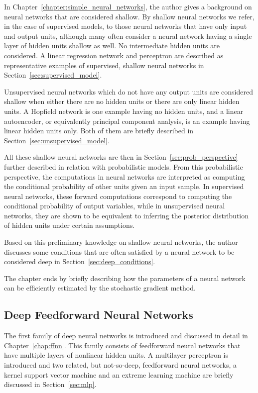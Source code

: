 \documentclass{now}
\begin{document}
In Chapter~\ref{chapter:simple_neural_networks}, the author gives a background
on neural networks that are considered shallow. By shallow neural networks we
refer, in the case of supervised models, to those neural networks that have
only input and output units, although many often consider a neural network
having a single layer of hidden units shallow as well. No intermediate hidden
units are considered. A linear regression network and perceptron are described
as representative examples of supervised, shallow neural networks in
Section~\ref{sec:supervised_model}.

Unsupervised neural networks which do not have any output units are considered
shallow when either there are no hidden units or there are only linear hidden
units. A Hopfield network is one example having no hidden units, and a linear
autoencoder, or equivalently principal component analysis, is an example having
linear hidden units only. Both of them are briefly described in
Section~\ref{sec:unsupervised_model}.

All these shallow neural networks are then in
Section~\ref{sec:prob_perspective} further described in relation with
probabilistic models. From this probabilistic perspective, the computations in
neural networks are interpreted as computing the conditional probability of
other units given an input sample. In supervised neural networks, these forward
computations correspond to computing the conditional probability of output
variables, while in unsupervised neural networks, they are shown to be
equivalent to inferring the posterior distribution of hidden units under
certain assumptions.

Based on this preliminary knowledge on shallow neural networks, the author
discusses some conditions that are often satisfied by a neural network to be
considered deep in Section~\ref{sec:deep_conditions}. 

The chapter ends by briefly describing how the parameters of a neural network
can be efficiently estimated by the stochastic gradient method.

\subsection{Deep Feedforward Neural Networks}

The first family of deep neural networks is introduced and discussed in detail
in Chapter~\ref{chap:ffnn}. This family consists of feedforward neural networks
that have multiple layers of nonlinear hidden units.  A multilayer perceptron
is introduced and two related, but not-so-deep, feedforward neural networks, a
kernel support vector machine and an extreme learning machine are briefly
discussed in Section~\ref{sec:mlp}.
\end{document}

